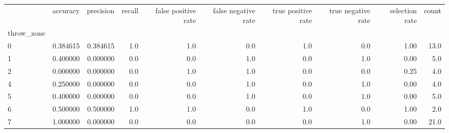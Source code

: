 \begin{tabular}{lrrrrrrrrr}
\toprule
{} &  accuracy &  precision &  recall &  false positive rate &  false negative rate &  true positive rate &  true negative rate &  selection rate &  count \\
throw\_zone &           &            &         &                      &                      &                     &                     &                 &        \\
\midrule
0          &  0.384615 &   0.384615 &     1.0 &                  1.0 &                  0.0 &                 1.0 &                 0.0 &            1.00 &   13.0 \\
1          &  0.400000 &   0.000000 &     0.0 &                  0.0 &                  1.0 &                 0.0 &                 1.0 &            0.00 &    5.0 \\
2          &  0.000000 &   0.000000 &     0.0 &                  1.0 &                  1.0 &                 0.0 &                 0.0 &            0.25 &    4.0 \\
4          &  0.250000 &   0.000000 &     0.0 &                  0.0 &                  1.0 &                 0.0 &                 1.0 &            0.00 &    4.0 \\
5          &  0.400000 &   0.000000 &     0.0 &                  0.0 &                  1.0 &                 0.0 &                 1.0 &            0.00 &    5.0 \\
6          &  0.500000 &   0.500000 &     1.0 &                  1.0 &                  0.0 &                 1.0 &                 0.0 &            1.00 &    2.0 \\
7          &  1.000000 &   0.000000 &     0.0 &                  0.0 &                  0.0 &                 0.0 &                 1.0 &            0.00 &   21.0 \\
\bottomrule
\end{tabular}
